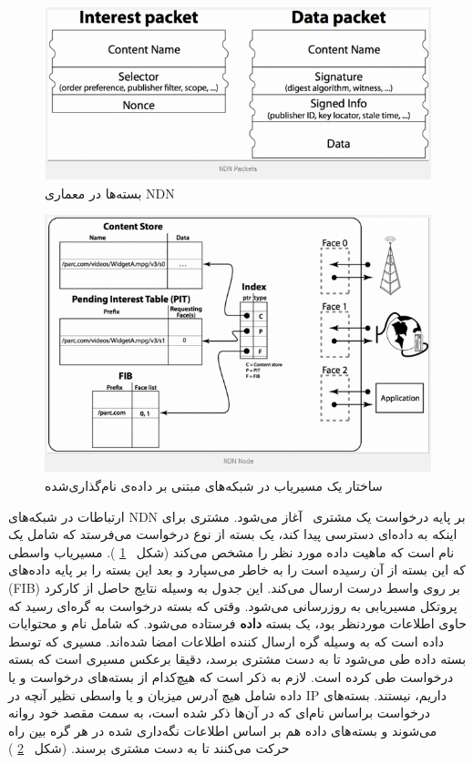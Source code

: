 \begin{figure}[H]
\centering
\includegraphics[scale=0.75]{./resources/figures/3_NDNpackets.png}
\caption{بسته‌ها در معماری NDN}
\label{fig:packets}
\end{figure}

\begin{figure}[H]
\centering
\includegraphics[scale=0.75]{./resources/figures/3_NDNnode.png}
\caption{ساختار یک مسیریاب در شبکه‌های مبتنی بر داده‌ی نام‌گذاری‌شده}
\label{fig:node}
\end{figure}



ارتباطات در شبکه‌های NDN بر پایه درخواست یک مشتری
\
 آغاز می‌شود. مشتری برای اینکه به داده‌ای دسترسی پیدا کند، یک بسته از نوع درخواست می‌فرستد که شامل یک نام است که ماهیت داده مورد نظر را مشخص می‌کند (شکل
‍‍‍‍~\ref{fig:packets}
). مسیریاب واسطی که این بسته از آن رسیده است را به خاطر می‌سپارد و بعد این بسته را بر پایه داده‌های  (FIB) بر روی واسط درست ارسال می‌کند. این جدول به وسیله نتایج حاصل از کارکرد پروتکل مسیریابی به روزرسانی می‌شود. وقتی که بسته درخواست به گره‌ای رسید که حاوی اطلاعات موردنظر بود، یک بسته \textbf{داده} فرستاده می‌شود. که شامل نام و محتوایات داده است که به وسیله گره ارسال کننده اطلاعات امضا شده‌اند. مسیری که توسط بسته داده طی می‌شود تا به دست مشتری برسد، دقیقا برعکس مسیری است که بسته درخواست طی کرده است. لازم به ذکر است که هیچ‌کدام از بسته‌‌های درخواست و یا داده شامل هیچ آدرس میزبان و یا واسطی نظیر آنچه در IP  داریم، نیستند. بسته‌های درخواست براساس نام‌ای که در آن‌ها ذکر شده است، به سمت مقصد خود روانه می‌شوند و بسته‌های داده هم بر اساس اطلاعات نگه‌داری شده در هر گره بین راه حرکت می‌کنند تا به دست مشتری برسند. (‌شکل
~\ref{fig:node}
)


